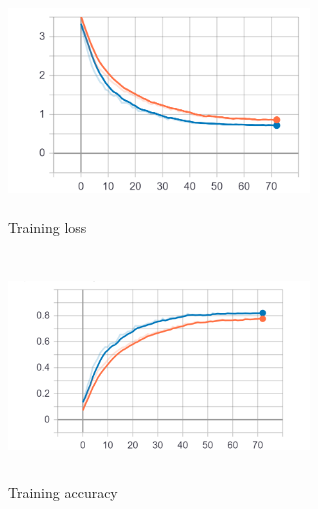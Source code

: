 \begin{figure}[h]
			\centering
	    	\includegraphics[width=8cm, height=6cm]{debug_tuy_loss}
	    	\caption{Training loss}
	    	\label{fig:CNN_loss}
\end{figure} 

\begin{figure}[h]
			\centering
	    	\includegraphics[width=8cm, height=6cm]{debug_tuy_acc}
	    	\caption{Training accuracy}
	    	\label{fig:CNN_accuracy}
\end{figure} 




